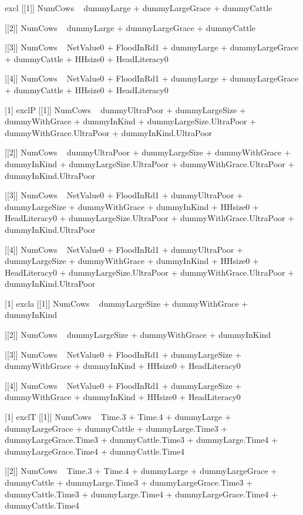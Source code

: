 \begin{Schunk}
\begin{Soutput}
[1] excl
[[1]]
NumCows ~ dummyLarge + dummyLargeGrace + dummyCattle

[[2]]
NumCows ~ dummyLarge + dummyLargeGrace + dummyCattle

[[3]]
NumCows ~ NetValue0 + FloodInRd1 + dummyLarge + dummyLargeGrace + 
    dummyCattle + HHsize0 + HeadLiteracy0

[[4]]
NumCows ~ NetValue0 + FloodInRd1 + dummyLarge + dummyLargeGrace + 
    dummyCattle + HHsize0 + HeadLiteracy0

[1] exclP
[[1]]
NumCows ~ dummyUltraPoor + dummyLargeSize + dummyWithGrace + 
    dummyInKind + dummyLargeSize.UltraPoor + dummyWithGrace.UltraPoor + 
    dummyInKind.UltraPoor

[[2]]
NumCows ~ dummyUltraPoor + dummyLargeSize + dummyWithGrace + 
    dummyInKind + dummyLargeSize.UltraPoor + dummyWithGrace.UltraPoor + 
    dummyInKind.UltraPoor

[[3]]
NumCows ~ NetValue0 + FloodInRd1 + dummyUltraPoor + dummyLargeSize + 
    dummyWithGrace + dummyInKind + HHsize0 + HeadLiteracy0 + 
    dummyLargeSize.UltraPoor + dummyWithGrace.UltraPoor + dummyInKind.UltraPoor

[[4]]
NumCows ~ NetValue0 + FloodInRd1 + dummyUltraPoor + dummyLargeSize + 
    dummyWithGrace + dummyInKind + HHsize0 + HeadLiteracy0 + 
    dummyLargeSize.UltraPoor + dummyWithGrace.UltraPoor + dummyInKind.UltraPoor

[1] excla
[[1]]
NumCows ~ dummyLargeSize + dummyWithGrace + dummyInKind

[[2]]
NumCows ~ dummyLargeSize + dummyWithGrace + dummyInKind

[[3]]
NumCows ~ NetValue0 + FloodInRd1 + dummyLargeSize + dummyWithGrace + 
    dummyInKind + HHsize0 + HeadLiteracy0

[[4]]
NumCows ~ NetValue0 + FloodInRd1 + dummyLargeSize + dummyWithGrace + 
    dummyInKind + HHsize0 + HeadLiteracy0

[1] exclT
[[1]]
NumCows ~ Time.3 + Time.4 + dummyLarge + dummyLargeGrace + dummyCattle + 
    dummyLarge.Time3 + dummyLargeGrace.Time3 + dummyCattle.Time3 + 
    dummyLarge.Time4 + dummyLargeGrace.Time4 + dummyCattle.Time4

[[2]]
NumCows ~ Time.3 + Time.4 + dummyLarge + dummyLargeGrace + dummyCattle + 
    dummyLarge.Time3 + dummyLargeGrace.Time3 + dummyCattle.Time3 + 
    dummyLarge.Time4 + dummyLargeGrace.Time4 + dummyCattle.Time4


\end{Soutput}
\end{Schunk}
